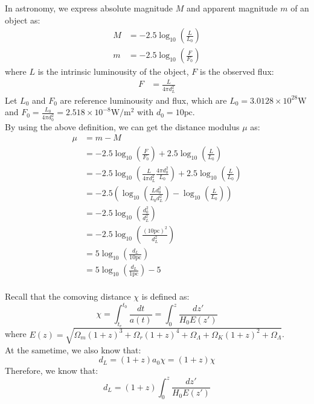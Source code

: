 \bigskip \noindent
\begin{foundation}
    In astronomy, we express absolute magnitude $M$ and apparent magnitude $m$ of an object as:
    \begin{align*}
        M &= -2.5 \log_{10} \left( \frac{L}{L_0} \right) \\
        m &= -2.5 \log_{10} \left( \frac{F}{F_0} \right)
    \end{align*}
    where $L$ is the intrinsic luminousity of the object, $F$ is the observed flux:
    \begin{align*}
        F &= \frac{L}{4\pi d_L^2}
    \end{align*}
    Let $L_0$ and $F_0$ are reference luminousity and flux, which are $L_0 = 3.0128 \times 10^{28} \mathrm{W}$ and $F_0 = \frac{L_0}{4\pi d_0^2} = 2.518 \times 10^{-8} \mathrm{W/m^2}$ with $d_0 = 10 \mathrm{pc}$. \\

    By using the above definition, we can get the distance modulus $\mu$ as:
    \begin{align*}
        \mu &= m - M  \\
            &= -2.5 \log_{10} \left( \frac{F}{F_0} \right) + 2.5 \log_{10} \left( \frac{L}{L_0} \right) \\
            &= -2.5 \log_{10} \left( \frac{L}{4\pi d_L^2} \frac{4\pi d_0^2}{L_0} \right) + 2.5 \log_{10} \left( \frac{L}{L_0} \right) \\
            &= -2.5 \left( \log_{10} \left( \frac{Ld_0^2}{L_0 d_L^2} \right) - \log_{10} \left( \frac{L}{L_0} \right) \right)\\
            &= -2.5 \log_{10} \left( \frac{d_0^2}{d_L^2} \right) \\
            &= -2.5 \log_{10} \left( \frac{(10 \mathrm{pc})^2}{d_L^2} \right) \\
            &= 5 \log_{10} \left( \frac{d_L}{10 \mathrm{pc}} \right) \\
            &= 5 \log_{10} \left( \frac{d_L}{1 \mathrm{pc}} \right) - 5
    \end{align*} \\

    Recall that the comoving distance $\chi$ is defined as:
    \[
        \chi = \int_{t_e}^{t_0} \frac{dt}{a(t)} = \int_0^z \frac{dz'}{H_0 E(z')}
    \]
    where $E(z) = \sqrt{\Omega_{m}(1+z)^3 + \Omega_{r}(1+z)^4 + \Omega_{\Lambda} + \Omega_{K}(1+z)^2 + \Omega_{\Lambda}}$. \\

    At the sametime, we also know that:
    \[
        d_L = (1+z) a_0 \chi = (1+z) \chi
    \]
    Therefore, we know that:
    \[
        d_L = (1+z) \int_0^z \frac{dz'}{H_0 E(z')}
    \]
\end{foundation}

